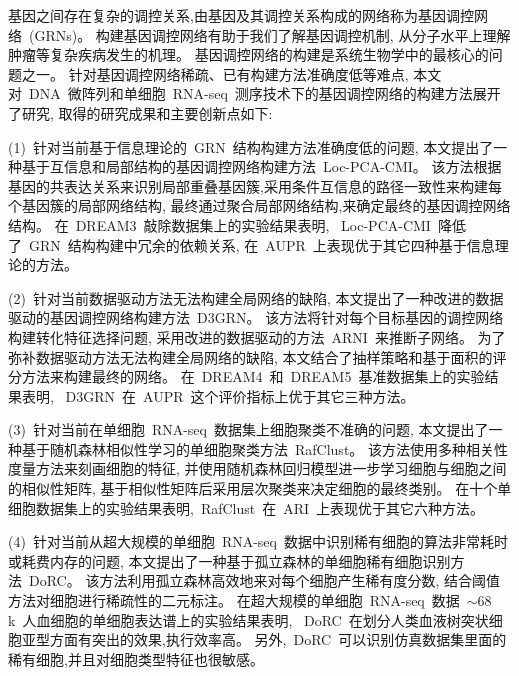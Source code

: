 \begin{abstractcn}\setlength{\baselineskip}{20pt}%

基因之间存在复杂的调控关系,由基因及其调控关系构成的网络称为基因调控网络~(GRNs)。
构建基因调控网络有助于我们了解基因调控机制,
从分子水平上理解肿瘤等复杂疾病发生的机理。
基因调控网络的构建是系统生物学中的最核心的问题之一。
针对基因调控网络稀疏、已有构建方法准确度低等难点, 
本文对~DNA~微阵列和单细胞~RNA-seq~测序技术下的基因调控网络的构建方法展开了研究,
取得的研究成果和主要创新点如下:

(1)~针对当前基于信息理论的~GRN~结构构建方法准确度低的问题,
本文提出了一种基于互信息和局部结构的基因调控网络构建方法~Loc-PCA-CMI。
该方法根据基因的共表达关系来识别局部重叠基因簇,采用条件互信息的路径一致性来构建每个基因簇的局部网络结构,
最终通过聚合局部网络结构,来确定最终的基因调控网络结构。
在~DREAM3~敲除数据集上的实验结果表明,
~Loc-PCA-CMI~降低了~GRN~结构构建中冗余的依赖关系,
在~AUPR~上表现优于其它四种基于信息理论的方法。

(2)~针对当前数据驱动方法无法构建全局网络的缺陷,
本文提出了一种改进的数据驱动的基因调控网络构建方法~D3GRN。
该方法将针对每个目标基因的调控网络构建转化特征选择问题,
采用改进的数据驱动的方法~ARNI~来推断子网络。
为了弥补数据驱动方法无法构建全局网络的缺陷,
本文结合了抽样策略和基于面积的评分方法来构建最终的网络。
在~DREAM4~和~DREAM5~基准数据集上的实验结果表明,
~D3GRN~在~AUPR~这个评价指标上优于其它三种方法。

(3)~针对当前在单细胞~RNA-seq~数据集上细胞聚类不准确的问题,
本文提出了一种基于随机森林相似性学习的单细胞聚类方法~RafClust。
该方法使用多种相关性度量方法来刻画细胞的特征, 
并使用随机森林回归模型进一步学习细胞与细胞之间的相似性矩阵,
基于相似性矩阵后采用层次聚类来决定细胞的最终类别。
在十个单细胞数据集上的实验结果表明,~RafClust~在~ARI~上表现优于其它六种方法。

(4)~针对当前从超大规模的单细胞~RNA-seq~数据中识别稀有细胞的算法非常耗时或耗费内存的问题,
本文提出了一种基于孤立森林的单细胞稀有细胞识别方法~DoRC。
该方法利用孤立森林高效地来对每个细胞产生稀有度分数,
结合阈值方法对细胞进行稀疏性的二元标注。
在超大规模的单细胞~RNA-seq~数据~${\sim}68$k~人血细胞的单细胞表达谱上的实验结果表明,
~DoRC~在划分人类血液树突状细胞亚型方面有突出的效果,执行效率高。
另外,~DoRC~可以识别仿真数据集里面的稀有细胞,并且对细胞类型特征也很敏感。


\end{abstractcn}
